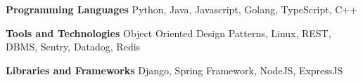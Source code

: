 \vspace{-2mm}


\begin{cvskills}

  \cvskill
  {\textbf{Programming Languages}}
  {Python, Java, Javascript, Golang, TypeScript, C++}

  \cvskill
	{\textbf{Tools and Technologies}}
    {Object Oriented Design Patterns, Linux, REST, DBMS, Sentry, Datadog, Redis}

  \cvskill
  {\textbf{Libraries and Frameworks}}
  {Django, Spring Framework, NodeJS, ExpressJS}

\end{cvskills}